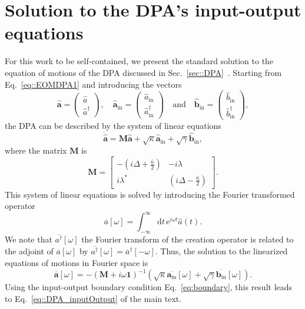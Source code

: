 \documentclass[pra,twocolumn,superscriptaddress]{revtex4-1}
\newcommand{\ah}[0]{\hat{a}}
\newcommand{\kappaTot}[0]{\overline{\kappa}}
\newcommand{\ain}[0]{\hat{a}_{\mathrm{in}}}
\newcommand{\bin}[0]{\hat{b}_{\mathrm{in}}}
\newcommand{\parS}[1]{\left[#1\right]}
\newcommand{\parO}[1]{\left(#1\right)}
\newcommand{\matO}[1]{\parO{\begin{matrix}#1\end{matrix}}}
\newcommand{\matS}[1]{\parS{\begin{matrix}#1\end{matrix}}}
\newcommand{\drm}[0]{\mathrm{d}}
\newcommand{\erm}[0]{\mathrm{e}}
\begin{document}
\section{Solution to the DPA's input-output equations}\label{app::solvingDPA}
% 
For this work to be self-contained, we present the standard solution to the equation of motions of the DPA discussed  in Sec.~\ref{sec::DPA}~\cite{Collett:1984kl,Gardiner:2004fk}. Starting from Eq.~\eqref{eq::EOMDPA1} and introducing the vectors
% 
\begin{equation}
	\hat{\mathbf{a} }
	= \matO{\ah \\ \ah^\dagger},
	\quad
	\hat{\mathbf{a}}_{\mathrm{in}} = 
	\matO{\ain \\ \ain^\dagger} 
	\quad
	\text{and}
	\quad
	\hat{\mathbf{b}}_{\mathrm{in}} = 
	\matO{\bin \\ \bin^\dagger} ,
\end{equation}
% 
the DPA can be described by the system of linear equations
% 
\begin{equation}
	\dot{\hat{\mathbf{a}}}
	= 
	\mathbf{M} \hat{\mathbf{a}}
	+\sqrt{\kappa} \hat{\mathbf{a}}_{\mathrm{in}}
	+\sqrt{\gamma} \hat{\mathbf{b}}_{\mathrm{in}},
\end{equation}
% 
where the matrix $\mathbf{M}$ is
% 
\begin{equation}
	\mathbf{M} =
	\matS{
	-\parO{i \Delta + \frac{\kappaTot}{2} }
	& 
	- i \lambda
	\\
	i \lambda^*
	&
	\parO{i \Delta - \frac{\kappaTot}{2} }
	}.
\end{equation}
% 
This system of linear equations is solved by introducing the Fourier transformed operator
\begin{equation}
	\overline{a}\parS{\omega}
	= 
	\int_{-\infty}^{\infty}
	\drm t \,  \erm^{i \omega t} \ah(t).
\end{equation}
% 
We note that $\overline{a^\dagger}[\omega]$ the Fourier transform of the creation operator is related to the adjoint of $\overline{a}[\omega]$ by $\overline{a^\dagger}[\omega] = \overline{a}^\dagger[-\omega]$. Thus, the solution to the linearized equations of motions in Fourier space is~\cite{Collett:1984kl,Gardiner:2004fk}
% 
\begin{equation}
	\overline{\mathbf{a}}\parS{\omega} = 
	-\parO{\mathbf{M} + i \omega \mathbf{1}}^{-1}
	\parO{
		\sqrt{\kappa}
		\overline{\mathbf{a}_{\mathrm{in}}}\parS{\omega}
		+
		\sqrt{\gamma}
		\overline{\mathbf{b}_{\mathrm{in}}}\parS{\omega}
	}.
\end{equation}
Using the input-output boundary condition Eq.~\eqref{eq:boundary}, this result leads to Eq.~\eqref{eq::DPA_inputOutput} of the main text.
\end{document}
